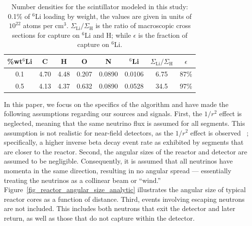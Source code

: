 \documentclass[tightenlines,twocolumn,prl,notitlepage,nofootinbib,preprintnumbers,longbibliography]{revtex4-1}
\begin{document}
\begin{table}[h]
    \centering
    \begin{tabular}{|c|c|c|c|c|c|c|c|}
        \hline
        \%\;wt\;$^6$Li & C & H & O & N & $^6$Li & $\Sigma_{\mathrm{Li}} / \Sigma_\mathrm{H}$ &  $\epsilon$ \\
        \hline
        0.1 & 4.70 & 4.48 & 0.207 & 0.0890 & 0.0106 & 6.75 & 87\% \\
        \hline
        0.5 & 4.13 & 4.37 & 0.632 & 0.0890 & 0.0528 & 34.5 & 97\% \\
        \hline
    \end{tabular}
\caption{Number densities for the scintillator modeled in this study: 0.1\% of $^6$Li loading by weight, the values are given in units of $10^{22}$ atoms per cm$^3$. $\Sigma_{\mathrm{Li}} / \Sigma_\mathrm{H}$ is the ratio of macroscopic cross sections for capture on $^6$Li and H; while $\epsilon$ is the fraction of capture on $^6$Li.}
    \label{tab:li6_loading}
\end{table}

In this paper, we focus on the specifics of the algorithm and have made the following assumptions regarding our sources and signals. First, the \(1/r^2\) effect is neglected, meaning that the same neutrino flux is assumed for all segments. This assumption is not realistic for near-field detectors, as the \(1/r^2\) effect is observed~\cite{Jayakumar:2024job} \cite{AlekseevI.2025Ltrr}; specifically, a higher inverse beta decay event rate as exhibited by segments that are closer to the reactor.
Second, the angular sizes of the reactor and detector are assumed to be negligible. Consequently, it is assumed that all neutrinos have momenta in the same direction, resulting in no angular spread --- essentially treating the neutrinos as a collinear beam or ``wind.'' Figure~\ref{fig_reactor_angular_size_analytic} illustrates the angular size of typical reactor cores as a function of distance.
Third, events involving escaping neutrons are not included. This includes both neutrons that exit the detector and later return, as well as those that do not capture within the detector.

\renewcommand{\arraystretch}{1.0} 


\end{document}
